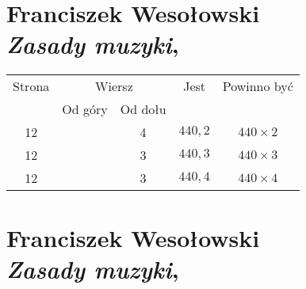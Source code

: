 \documentclass[a4paper,11pt]{article}
\numberwithin{equation}{section}
\begin{document}
\section{ %
  Franciszek Wesołowski \\
  \textit{Zasady muzyki}, \cite{WesolowskiZasadyMuzyki2017}}







\begin{center}

  \begin{tabular}{|c|c|c|c|c|}
    \hline
    Strona & \multicolumn{2}{c|}{Wiersz} & Jest
                              & Powinno być \\ \cline{2-3}
    & Od góry & Od dołu & & \\
    \hline
    12  & &  4 & $440,\! 2$ & $440 \times 2$ \\
    12  & &  3 & $440,\! 3$ & $440 \times 3$ \\
    12  & &  3 & $440,\! 4$ & $440 \times 4$ \\
    \hline
  \end{tabular}

\end{center}

\VerSpaceTwo













\section{ %
  Franciszek Wesołowski \\
  \textit{Zasady muzyki},
  \cite{WesolowskiZasadyMuzyki2021}}





\end{document}
